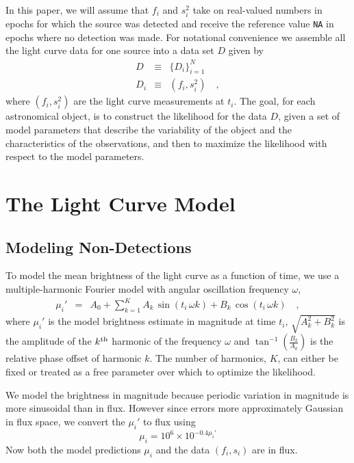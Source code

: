 \documentclass[12pt,preprint]{aastex}
\newcommand{\fobs}{f_i}
\newcommand{\sobs}{s^2_i}
\begin{document}
In this paper, we will assume that $\fobs$ and $\sobs$ take on real-valued numbers in epochs for which the source was detected and receive the reference value {\tt NA} in epochs where no detection was made. For notational convenience we assemble all the light curve data for one source into a data set $D$ given by
\begin{eqnarray}\displaystyle
D &\equiv& \{D_i\}_{i=1}^N
\\
D_i &\equiv& (\fobs, \sobs)
\quad ,
\end{eqnarray}
where $(\fobs, \sobs)$ are the light curve measurements  at $t_i$.  The goal, for each astronomical object, is to construct the likelihood for the data $D$, given a set of model parameters that describe the variability of the object and the characteristics of the observations, and then to maximize the likelihood with respect to the model parameters.%


\section{The Light Curve Model}
\label{sec:model}
\subsection{Modeling Non-Detections}
To model the mean brightness of the light curve as a function of time, we use a multiple-harmonic Fourier model with angular oscillation frequency $\omega$,
\begin{eqnarray}\displaystyle
\mu_i' &=& A_0 + \sum_{k=1}^K A_k\, \sin (t_i \, \omega  k) + B_k\, \cos (t_i \, \omega  k)
\quad ,\label{eq:fourier}
\end{eqnarray}
where $\mu_i'$ is the model brightness estimate in magnitude at time $t_i$, $\sqrt{A_k^2 + B_k^2}$ is the amplitude of the $k^{\rm th}$ harmonic of the frequency $\omega$ and $\tan^{-1}(\frac{B_k}{A_k})$ is the relative phase offset of harmonic $k$.  The number of harmonics, $K$, can either be fixed or treated as a free parameter over which to optimize the likelihood.

We model the brightness in magnitude because periodic variation in magnitude is more sinusoidal than in flux. However since errors more approximately Gaussian in flux space, we convert the $\mu_i'$ to flux  using
\begin{equation*}
\mu_i = 10^6 \times 10^{-0.4 \mu_i'}
\end{equation*}
Now both the model predictions $\mu_i$ and the data $(f_i,s_i)$ are in flux.
\end{document}

